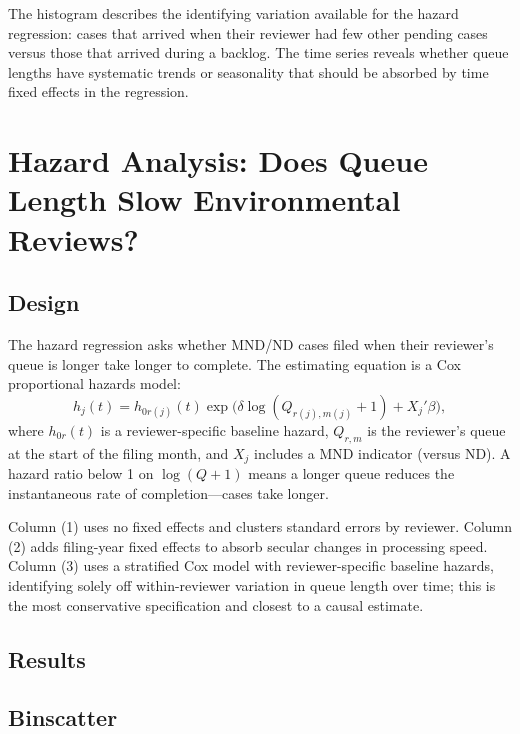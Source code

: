 \documentclass[12pt]{article}
\begin{document}
The histogram describes the identifying variation available for the hazard regression: cases that arrived when their reviewer had few other pending cases versus those that arrived during a backlog. The time series reveals whether queue lengths have systematic trends or seasonality that should be absorbed by time fixed effects in the regression.

\section{Hazard Analysis: Does Queue Length Slow Environmental Reviews?}

\subsection{Design}

The hazard regression asks whether MND/ND cases filed when their reviewer's queue is longer take longer to complete. The estimating equation is a Cox proportional hazards model:
\[
  h_j(t) = h_{0r(j)}(t) \exp\!\bigl(\delta \log(Q_{r(j),m(j)} + 1) + X_j'\beta\bigr),
\]
where $h_{0r}(t)$ is a reviewer-specific baseline hazard, $Q_{r,m}$ is the reviewer's queue at the start of the filing month, and $X_j$ includes a MND indicator (versus ND). A hazard ratio below 1 on $\log(Q+1)$ means a longer queue reduces the instantaneous rate of completion---cases take longer.

Column (1) uses no fixed effects and clusters standard errors by reviewer. Column (2) adds filing-year fixed effects to absorb secular changes in processing speed. Column (3) uses a stratified Cox model with reviewer-specific baseline hazards, identifying solely off within-reviewer variation in queue length over time; this is the most conservative specification and closest to a causal estimate.

\subsection{Results}

{\footnotesize

}

\subsection{Binscatter}
\end{document}
